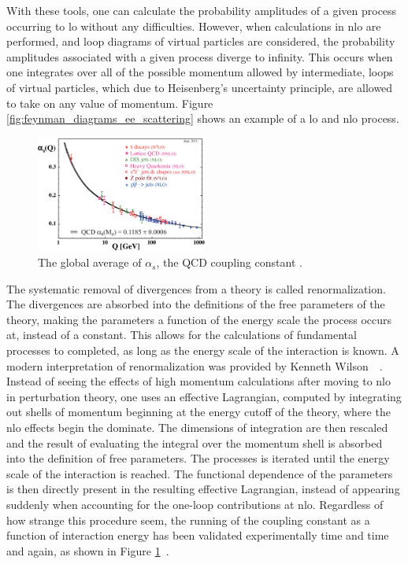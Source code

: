 \par With these tools, one can calculate the probability amplitudes of
a given process occurring to \acrfull{lo} without any
difficulties.  However, when calculations in \acrfull{nlo} are
performed, and loop diagrams of virtual particles are considered, the
probability amplitudes associated with a given process diverge to
infinity.  This occurs when one integrates over all of the 
possible momentum allowed by intermediate, loops of virtual particles,
which due to Heisenberg's uncertainty principle, are allowed to take
on any value of momentum.  Figure
\ref{fig:feynman_diagrams_ee_scattering} shows an example of a
\acrshort{lo} and \acrshort{nlo} process.

\begin{figure}[h]
  \centering
  \includegraphics[width=0.5\textwidth]{Figures/Experimental_Results/asq-2013.eps}
  \caption{The global average of $\alpha_{s}$, the QCD coupling
    constant \cite{Bethke_WorldAvgAlphaS_QCD}.}\label{fig:globalAvgAlphaS}
\end{figure}

\par The systematic removal of divergences from a theory is called
renormalization.  The divergences are absorbed into the
definitions of the free parameters of the theory, making the parameters a function of
the energy scale the process occurs at, instead of a constant.  This
allows for the calculations of fundamental processes to completed,
as long as the energy scale of the interaction is known.  A modern
interpretation of renormalization was provided by Kenneth
Wilson~\cite{th:Wilson_renormalization1}~\cite{th:Wilson_renormalization2}.
Instead of seeing the effects of high momentum calculations after
moving to \acrshort{nlo} in perturbation theory, one uses an effective Lagrangian,
computed by integrating out shells of momentum beginning at the energy
cutoff of the theory, where the \acrshort{nlo} effects begin the
dominate.  The dimensions of integration are then rescaled and the
result of evaluating the integral over the momentum shell is absorbed
into the definition of free parameters.  The processes is iterated
until the energy scale of the interaction is reached.  The functional 
dependence of the parameters is then  directly present in the resulting
effective Lagrangian, instead of appearing suddenly when accounting
for the one-loop contributions at \acrshort{nlo}.  Regardless of how
strange this procedure seem, the running of the coupling constant as a
function of interaction energy has been validated experimentally time
and time and again, as shown in Figure \ref{fig:globalAvgAlphaS}~\cite{Bethke_WorldAvgAlphaS_QCD}.



